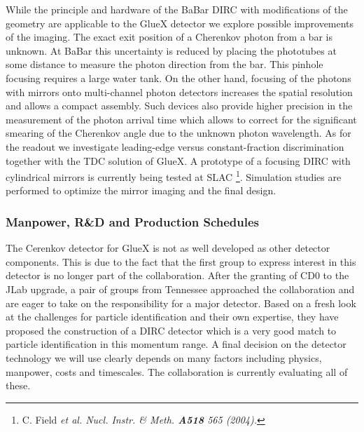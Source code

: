 While the principle and hardware of the BaBar DIRC with modifications of 
the geometry are applicable to the GlueX detector we explore possible 
improvements of the imaging. 
The exact exit position of a Cherenkov photon from a bar is unknown.
At BaBar this uncertainty is reduced by placing the phototubes at some
distance to measure the photon direction from the bar. This pinhole focusing
requires a large water tank. On the other hand, focusing of the photons
with mirrors onto multi-channel photon detectors increases the spatial
resolution and allows a compact assembly. Such devices also provide higher
precision in the measurement of the photon arrival time which allows to
correct for the significant smearing of the Cherenkov angle due to the 
unknown photon wavelength. As for the readout we investigate leading-edge 
versus constant-fraction discrimination together with the TDC solution of 
GlueX. A prototype of a focusing DIRC with cylindrical mirrors is currently
being tested at SLAC
\footnote{C. Field \em{et al.} Nucl. Instr. \& Meth. \textbf{A518} 565 (2004).}.
Simulation studies are performed to optimize the mirror imaging and 
the final design.

\subsubsection*{Manpower, R\&D and Production Schedules}

The Cerenkov detector for GlueX is not as well developed as other detector components.
This is due to the fact that the first group to express interest in this detector
is no longer part of the collaboration. After the granting of CD0 to the JLab upgrade,
a pair of groups from Tennessee approached the collaboration and are eager to take
on the responsibility for a major detector. Based on a fresh look at the challenges
for particle identification and their own expertise, they have proposed the
construction of a DIRC detector which is a very good match to particle identification
in this momentum range. A final decision on the detector technology we will use clearly
depends on many factors including physics, manpower, costs and timescales. The collaboration
is currently evaluating all of these. 
